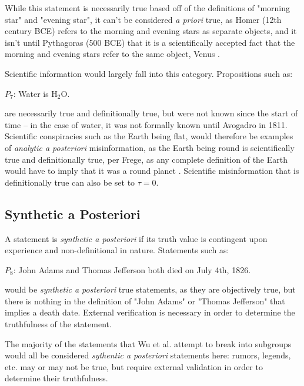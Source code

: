 \documentclass[preprint,review,12pt]{elsarticle}
\begin{document}
While this statement is necessarily true based off of the definitions of "morning star" and "evening star", it can't be considered \textit{a priori} true, as Homer (12th century BCE) refers to the morning and evening stars as separate objects, and it isn't until Pythagoras (500 BCE) that it is a scientifically accepted fact that the morning and evening stars refer to the same object, Venus \cite{dunne1978voyage}.

Scientific information would largely fall into this category. Propositions such as: 
\begin{center}
    $P_7$: Water is H$_2$O.
\end{center} 
are necessarily true and definitionally true, but were not known since the start of time -- in the case of water, it was not formally known until Avogadro in 1811. Scientific conspiracies such as the Earth being flat, would therefore be examples of \textit{analytic a posteriori} misinformation, as the Earth being round is scientifically true and definitionally true, per Frege, as any complete definition of the Earth would have to imply that it was a round planet \cite{frege2003sense}. Scientific misinformation that is definitionally true can also be set to $\tau = 0$.

\subsection{Synthetic a Posteriori}
A statement is \textit{synthetic a posteriori} if its truth value is contingent upon experience and non-definitional in nature. Statements such as: \begin{center}
    $P_8$: John Adams and Thomas Jefferson both died on July 4th, 1826.
\end{center}

would be \textit{synthetic a posteriori} true statements, as they are objectively true, but there is nothing in the definition of "John Adams" or "Thomas Jefferson" that implies a death date. External verification is necessary in order to determine the truthfulness of the statement.

The majority of the statements that Wu et al. attempt to break into subgroups would all be considered \textit{sythentic a posteriori} statements here: rumors, legends, etc. may or may not be true, but require external validation in order to determine their truthfulness.
\end{document}
